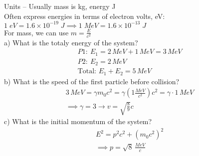 \documentclass[a4paper, 11pt, fleqn, normalem]{report}
\begin{document}
Units -- Usually mass is kg, energy J \\
Often express energies in terms of electron volts, eV: $1\;eV = 1.6\times10^{-19}\;J \implies 1\;MeV = 1.6\times10^{-13}\;J$ \\
For mass, we can use $m = \frac{E}{c^{2}}$ \\
a) What is the totaly energy of the system?
\begin{gather*}
    P1:~E_{1} = 2\,MeV + 1\,MeV = 3\,MeV \\
    P2:~E_{2} = 2\,MeV \\
    \text{Total: }E_{1} + E_{2} = 5\,MeV
\end{gather*}
b) What is the speed of the first particle before collision?
\begin{gather*}
    3\,MeV = \gamma m_{0}c^{2} = \gamma(1\frac{MeV}{c^{2}})c^{2} = \gamma\cdot1\,MeV \\
    \implies \gamma = 3 \rightarrow v = \sqrt{\frac{8}{9}}c
\end{gather*}
c) What is the initial momentum of the system?
\begin{gather*}
    E^{2} = p^{2}c^{2} + (m_{0}c^{2})^{2} \\
    \implies p = \sqrt{8}\,\frac{MeV}{c}
\end{gather*}
\end{document}
